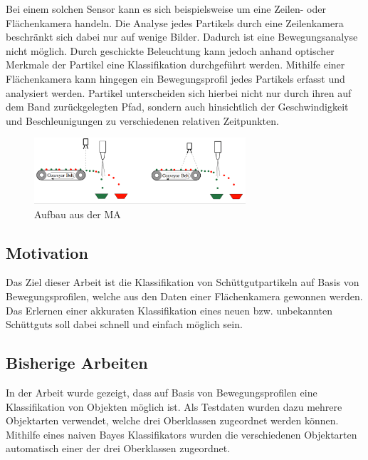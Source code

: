 Bei einem solchen Sensor kann es sich beispielsweise um eine Zeilen- oder Flächenkamera handeln. Die Analyse jedes Partikels durch eine Zeilenkamera beschränkt sich dabei nur auf wenige Bilder. Dadurch ist eine Bewegungsanalyse nicht möglich. Durch geschickte Beleuchtung kann jedoch anhand optischer Merkmale der Partikel eine Klassifikation durchgeführt werden. Mithilfe einer Flächenkamera kann hingegen ein Bewegungsprofil jedes Partikels erfasst und analysiert werden. Partikel unterscheiden sich hierbei nicht nur durch ihren auf dem Band zurückgelegten Pfad, sondern auch hinsichtlich der Geschwindigkeit und Beschleunigungen zu verschiedenen relativen Zeitpunkten.

\begin{figure}[!h]
    \centering
    \includegraphics[width=0.7\textwidth]{pics/aufbau.png}
    \caption{Aufbau aus der MA}
    \label{fig:Aufbau}
\end{figure}

\subsection{Motivation}
\label{sec:Motivation}
Das Ziel dieser Arbeit ist die Klassifikation von Schüttgutpartikeln auf Basis von Bewegungsprofilen, welche aus den Daten einer Flächenkamera gewonnen werden. Das Erlernen einer akkuraten Klassifikation eines neuen bzw. unbekannten Schüttguts soll dabei schnell und einfach möglich sein.

\subsection{Bisherige Arbeiten}
In der Arbeit \cite{MA} wurde gezeigt, dass auf Basis von Bewegungsprofilen eine Klassifikation von Objekten möglich ist. Als Testdaten wurden dazu mehrere Objektarten verwendet, welche drei Oberklassen zugeordnet werden können. Mithilfe eines naiven Bayes Klassifikators wurden die verschiedenen Objektarten automatisch einer der drei Oberklassen zugeordnet.

